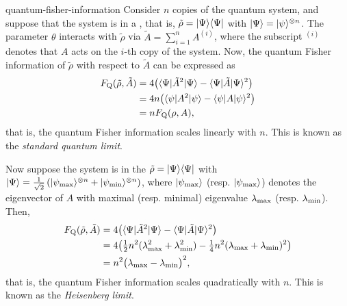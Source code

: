 \begin{example}{quantum-fisher-information}
    Consider $n$ copies of the quantum system, and suppose that the system is in a , that is, $\tilde{\rho} = |\Psi\rangle \langle\Psi|$ with $|\Psi\rangle = |\psi\rangle^{\otimes n}$. The parameter $\theta$ interacts with $\tilde{\rho}$ via $\tilde{A} = \sum_{i = 1}^{n} A^{(i)}$, where the subscript $^{(i)}$ denotes that $A$ acts on the $i$-th copy of the system. Now, the quantum Fisher information of $\tilde{\rho}$ with respect to $\tilde{A}$ can be expressed as
    \[ \begin{aligned}
        F_\textup{Q}(\tilde{\rho}, \tilde{A})
            &= 4 \big( \langle\Psi| \tilde{A}^2 |\Psi\rangle - \langle\Psi| \tilde{A} |\Psi\rangle^2 \big) \\
            &= 4 n \big( \langle\psi| A^2 |\psi\rangle - \langle\psi| A |\psi\rangle^2 \big) \\
            &= n F_\textup{Q}(\rho, A) ,
    \end{aligned} \]
    that is, the quantum Fisher information scales linearly with $n$. This is known as the \textit{standard quantum limit}.
    
    Now suppose the system is in the  $\tilde{\rho} = |\Psi\rangle \langle\Psi|$ with $|\Psi\rangle = \frac{1}{\sqrt{2}} \left( |\psi_\textup{max}\rangle^{\otimes n} + |\psi_\textup{min}\rangle^{\otimes n} \right)$, where $|\psi_\textup{max}\rangle$ (resp. $|\psi_\textup{max}\rangle$) denotes the eigenvector of $A$ with maximal (resp. minimal) eigenvalue $\lambda_\textup{max}$ (resp. $\lambda_\textup{min}$). Then,
    \[ \begin{aligned}
        F_\textup{Q}(\tilde{\rho}, \tilde{A})
            &= 4 \big( \langle\Psi| \tilde{A}^2 |\Psi\rangle - \langle\Psi| \tilde{A} |\Psi\rangle^2 \big) \\
            &= 4 \big( \tfrac{1}{2} n^2 (\lambda_\textup{max}^2 + \lambda_\textup{min}^2) - \tfrac{1}{4} n^2 (\lambda_\textup{max} + \lambda_\textup{min})^2 \big) \\
            &= n^2 \big( \lambda_\textup{max} - \lambda_\textup{min} \big)^2 ,
    \end{aligned} \]
    that is, the quantum Fisher information scales quadratically with $n$. This is known as the \textit{Heisenberg limit}.
\end{example}

